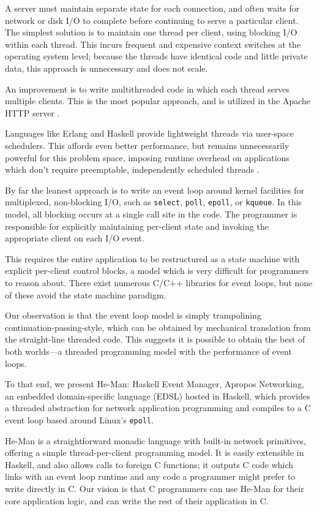 \documentclass[preprint]{sigplanconf}
\renewcommand{\t}{\texttt}
\begin{document}
A server must maintain separate state for each connection, and often waits for
network or disk I/O to complete before continuing to serve a particular client.
The simplest solution is to maintain one thread per client, using blocking I/O
within each thread. This incurs frequent and expensive context switches at the
operating system level; because the threads have identical code and little
private data, this approach is unnecessary and does not scale.

An improvement is to write multithreaded code in which each thread serves
multiple clients. This is the most popular approach, and is utilized in the
Apache HTTP server \cite{Apache}.

Languages like Erlang and Haskell provide lightweight threads via user-space
schedulers. This affords even better performance, but remains unnecessarily
powerful for this problem space, imposing runtime overhead on applications which
don't require preemptable, independently scheduled threads \cite{Vinoski}.

By far the leanest approach is to write an event loop around kernel facilities
for multiplexed, non-blocking I/O, such as \t{select}, \t{poll}, \t{epoll}, or
\t{kqueue}. In this model, all blocking occurs at a single call site in the
code. The programmer is responsible for explicitly maintaining per-client state
and invoking the appropriate client on each I/O event.

This requires the entire application to be restructured as a state machine with
explicit per-client control blocks, a model which is very difficult for
programmers to reason about. There exist numerous C/C++ libraries for event
loops, but none of these avoid the state machine paradigm.

Our observation is that the event loop model is simply trampolining
continuation-passing-style, %
which can be obtained by mechanical translation from the straight-line threaded
code. This suggests it is possible to obtain the best of both worlds---a
threaded programming model with the performance of event loops. 

To that end, we present He-Man: Haskell Event Manager, Apropos Networking, an
embedded domain-specific language (EDSL) hosted in Haskell, which provides a
threaded abstraction for network application programming and compiles to a C
event loop based around Linux's \t{epoll}.

He-Man is a straightforward monadic language with built-in network primitives,
offering a simple thread-per-client programming model. It is easily extensible
in Haskell, and also allows calls to foreign C functions; it outputs C code
which links with an event loop runtime and any code a programmer might prefer to
write directly in C. Our vision is that C programmers can use He-Man for their
core application logic, and can write the rest of their application in C. 
\end{document}
